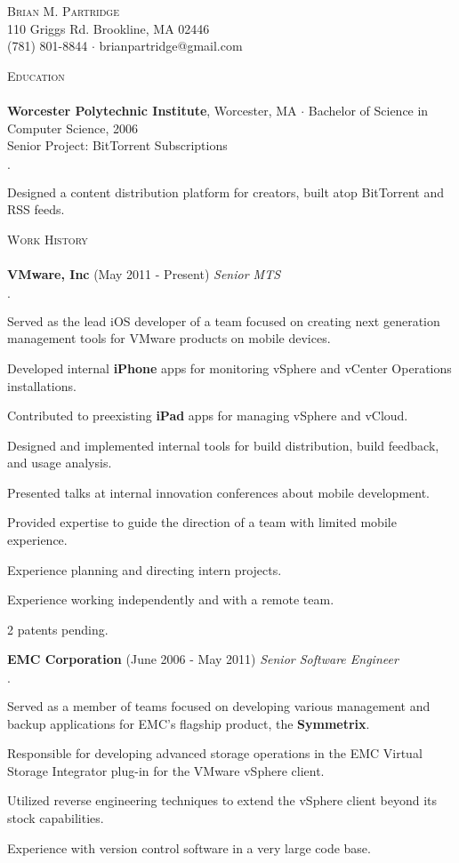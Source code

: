 \documentclass[11pt]{article}
\newcommand{\mydot}{$\cdot$ }
\newcommand{\lineunder}{\vspace*{-8pt} \\ \hspace*{-18pt} \hrulefill \\}
\newcommand{\header}[1]{{\hspace*{-15pt}\vspace*{6pt} \textsc{#1}} \vspace*{-6pt} \lineunder}
\newcommand{\contact}[3]{\vspace*{-8pt}\begin{center}{\LARGE \scshape {#1}}\\#2 \\ #3\end{center}\vspace*{-8pt}}
\newcommand{\school}[3]{\textbf{#1}{#2} \mydot #3 \\}
\newcommand{\seniorproject}[2]{Senior Project: #1\\ #2  }
\newcommand{\employer}[3]{\textbf{#1} (#2) \emph{#3}\\  }
\newenvironment{achievements}{\begin{list}{\mydot}{\topsep 0pt \itemsep -2pt}}{\vspace*{4pt}\end{list}}
\begin{document}
\small
\smallskip
\vspace*{-44pt}


\contact{Brian M. Partridge}
{110 Griggs Rd. Brookline, MA 02446}
{
(781) 801-8844
\mydot brianpartridge@gmail.com 
}


\header{Education}
\school{Worcester Polytechnic Institute}{, Worcester, MA}{Bachelor of Science in Computer Science, 2006}

\seniorproject{BitTorrent Subscriptions}{
\begin{achievements}
  \item Designed a content distribution platform for creators, built atop BitTorrent and RSS feeds.
\end{achievements}
}


\header{Work History}
\employer{VMware, Inc}{May 2011 - Present}{Senior MTS}
\begin{achievements}
  \item Served as the lead iOS developer of a team focused on creating next generation management tools for VMware products on mobile devices.
  \item Developed internal \textbf{iPhone} apps for monitoring vSphere and vCenter Operations installations.
  \item Contributed to preexisting \textbf{iPad} apps for managing vSphere and vCloud.
  \item Designed and implemented internal tools for build distribution, build feedback, and usage analysis.
  \item Presented talks at internal innovation conferences about mobile development.
  \item Provided expertise to guide the direction of a team with limited mobile experience.
  \item Experience planning and directing intern projects.
  \item Experience working independently and with a remote team.
  \item 2 patents pending.
\end{achievements}
  
\employer{EMC Corporation}{June 2006 - May 2011}{Senior Software Engineer}
\begin{achievements}
  \item Served as a member of teams focused on developing various management and backup applications for EMC's flagship product, the \textbf{Symmetrix}.
  \item Responsible for developing advanced storage operations in the EMC Virtual Storage Integrator plug-in for the VMware vSphere client.
  \item Utilized reverse engineering techniques to extend the vSphere client beyond its stock capabilities.
  \item Experience with version control software in a very large code base.
\end{achievements}
\end{document}
